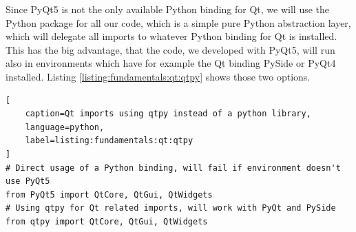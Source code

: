 \cite{PythonGil, PythonGilDocs}

Since PyQt5 is not the only available Python binding for Qt, we will use the
Python package  for all our code, which is a simple
pure Python abstraction layer, which will delegate all imports to whatever
Python binding for Qt is installed. This has the big advantage, that the code,
we developed with PyQt5, will run also in environments which have for example
the Qt binding PySide or PyQt4 installed. Listing
\ref{listing:fundamentals:qt:qtpy} shows those two options.

\begin{lstlisting}[
    caption=Qt imports using qtpy instead of a python library,
    language=python, 
    label=listing:fundamentals:qt:qtpy
]
# Direct usage of a Python binding, will fail if environment doesn't use PyQt5
from PyQt5 import QtCore, QtGui, QtWidgets
# Using qtpy for Qt related imports, will work with PyQt and PySide
from qtpy import QtCore, QtGui, QtWidgets
\end{lstlisting}

